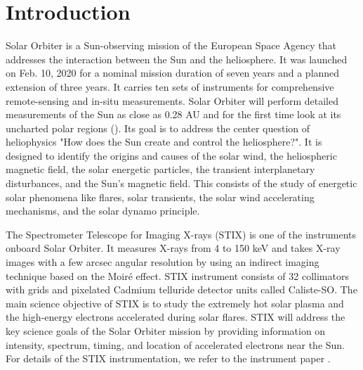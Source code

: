 \documentclass{aa}
\begin{document}
   \maketitle
%

\section{Introduction}
Solar Orbiter is a Sun-observing mission of the European Space  Agency that 
addresses the interaction between the Sun and the heliosphere.
It was launched on Feb. 10, 2020 for a nominal mission duration of seven years and a planned 
extension of
three years. It carries ten sets of instruments for comprehensive
remote-sensing and in-situ measurements. 
Solar Orbiter  will perform detailed measurements of the Sun as close as 0.28 AU and for the first time look at its uncharted polar regions (\cite{SolarOrbiter2020}).  
Its goal is to  address the center question of heliophysics  "How does the Sun create and control the heliosphere?".  It is designed to identify the origins and causes of the solar wind, the heliospheric magnetic field, the solar energetic particles, the transient interplanetary disturbances, and the Sun's magnetic field.
This consists of the study of energetic solar phenomena like flares,  solar transients,  the solar wind accelerating mechanisms, and the solar dynamo principle.  


The Spectrometer Telescope for Imaging X-rays (STIX) is one of the instruments onboard Solar Orbiter.  
It measures X-rays from 4 to 150 keV and takes X-ray images with a few arcsec angular resolution by using an indirect imaging technique based on the Moiré effect. 
STIX instrument consists of 32 collimators with
grids and pixelated Cadmium telluride detector units called Caliste-SO.
The main science objective of STIX is to study the extremely hot solar plasma and the high-energy electrons accelerated during solar flares. STIX will address the key science goals of the Solar Orbiter mission by providing information on intensity, 
spectrum, timing, and location of accelerated electrons near the Sun.
For details of the STIX instrumentation, we refer to the instrument paper \cite{StixInstrument}.
\end{document}
